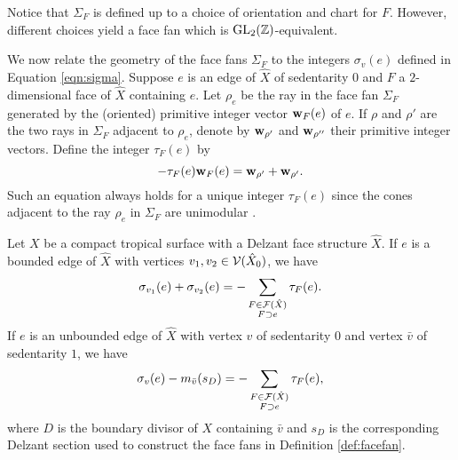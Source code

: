 \begin{defi}
\begin{itemize}
\end{itemize}
Notice that $\Sigma_F$ is defined up to a choice of orientation and chart for $F$. However,  different choices yield a face fan which is ${\rm GL}_2({\mathbb Z})$-equivalent. 
\end{defi}



We now relate the geometry of the face fans $\Sigma_F$ to the integers $\sigma_v(e)$ defined in Equation \eqref{eqn:sigma}. Suppose $e$ is an edge of $\hat{X}$ of sedentarity $0$ and $F$ a $2$-dimensional face of $\hat X$ containing $e$. 
Let $\rho_e$ be the ray in the face fan $\Sigma_F$ generated by the (oriented) primitive integer vector $\mathbf w_F(e)$ of $e$. 
If $\rho$ and $\rho'$ are the two rays in $\Sigma_F$ adjacent to $\rho_e$, denote by ${\bf w}_{\rho'}$ and ${\bf w}_{\rho''}$ their primitive integer vectors. 
Define the integer $\tau_F(e)$ by 
 \begin{equation} \label{eqn:tau} 
 - \tau_F(e) {\bf w}_F(e) = {\bf w}_{\rho'} + {\bf w}_{\rho'}.
\end{equation}
Such an equation always holds for a unique integer $ \tau_F(e)$ since the cones adjacent to the ray $\rho_e$ in $\Sigma_F$ are unimodular \cite[Section 2.5]{Fulton}.


\begin{lemma}\label{lem:ToricInt}
Let $X$ be a compact tropical surface with a Delzant face structure $\hat{X}$. 
If $e$ is a bounded edge of $\hat{X}$ with vertices $v_1, v_2 \in {\mathcal V}(\hat X_0)$, we have 
$$\sigma_{v_1}(e) + \sigma_{v_2}(e)  = - \sum_{\substack{F \in {{\mathcal F}}(\hat{X}) \\ F \supset e}} \tau_F(e).$$
If $e$ is an unbounded edge of $\hat{X}$ with vertex $v$ of sedentarity $0$ and vertex $\bar{v}$ 
of sedentarity $1$, we have  
$$\sigma_{v}(e) - m_{\bar{v}}(s_D)  = - \sum_{\substack{F \in {{\mathcal F}}(\hat{X}) \\ F \supset e}} \tau_F(e),$$ 
where $D$ is the boundary divisor of $X$ containing $\bar v$ and $s_D$ is the corresponding Delzant section used to construct the face fans in Definition \ref{def:facefan}. 
\end{lemma}

